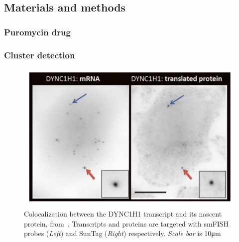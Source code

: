 \subsection{Materials and methods}
\label{subsec:materials_translation_factories}



\subsubsection{Puromycin drug}

\subsubsection{Cluster detection}


\begin{figure}[h]
    \centering
    \includegraphics[width=\textwidth]{figures/chapter5/translation_factory}
    \caption{Colocalization between the DYNC1H1 transcript and its nascent protein, from~\cite{pichon_visualization_2016}.
	Transcripts and proteins are targeted with smFISH probes (\textit{Left}) and SunTag (\textit{Right}) respectively.
	\textit{Scale bar} is 10μm}
    \label{fig:translation_factory}
\end{figure}

